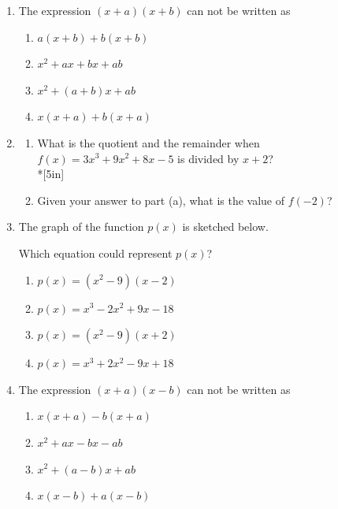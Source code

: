 \documentclass[12pt, oneside]{article}
\begin{document}
\begin{enumerate}
\newpage

\item The expression $(x + a)(x + b)$ can not be written as
\begin{enumerate}
    \item $a(x + b)+ b(x + b)$
    \item $x^2 + ax + bx + ab$ 
    \item  $x^2 + (a + b)x + ab$  
    \item $x(x + a)+ b(x + a)$
\end{enumerate}

\item 
\begin{enumerate}
    \item What is the quotient and the remainder when $f(x)=3x^3+9x^2+8x-5$ is divided by $x+2$?\\*[5in]
    \item Given your answer to part (a), what is the value of $f(-2)$?
\end{enumerate}


\newpage
\item The graph of the function $p(x)$ is sketched below.
\begin{center}
\end{center}
Which equation could represent $p(x)$?
\begin{enumerate}
    \item $p(x)=(x^2- 9)(x-2)$
    \item $p(x)=x^3 -2x^2+ 9x-18$
    \item $p(x)=(x^2- 9)(x+2)$
    \item $p(x)=x^3 +2x^2- 9x+18$
\end{enumerate} %

\item The expression $(x + a)(x - b)$ can not be written as
\begin{enumerate}
    \item $x(x + a)- b(x + a)$
    \item $x^2 + ax - bx - ab$ 
    \item  $x^2 + (a - b)x + ab$  
    \item $x(x - b)+ a(x - b)$
\end{enumerate}


\end{enumerate}
\end{document}

